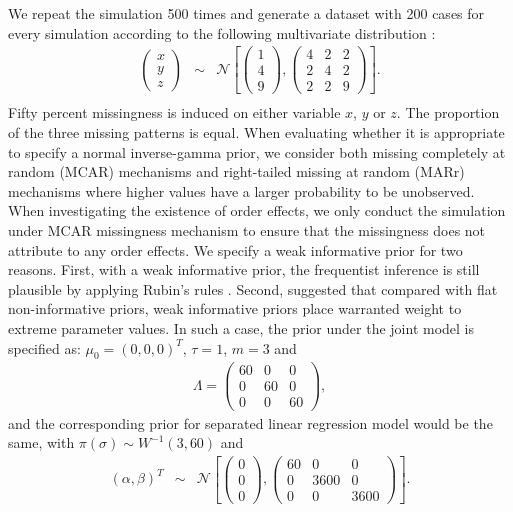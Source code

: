	We repeat the simulation 500 times and generate a dataset with 200 cases for every simulation according to the following multivariate distribution :
	\begin{eqnarray*}
		\begin{pmatrix}x\\
			y\\
			z
		\end{pmatrix} & \sim & \mathcal{N}\left[\left(\begin{array}{c}
			1\\
			4\\
			9
		\end{array}\right),\left(\begin{array}{ccc}
			4 & 2 & 2\\
			2 & 4 & 2\\
			2 & 2 & 9 
		\end{array}\right)\right].\\
	\end{eqnarray*}
	Fifty percent missingness is induced on either variable $x$, $y$ or $z$. The proportion of the three missing patterns is equal. When evaluating whether it is appropriate to specify a normal inverse-gamma prior, we consider both missing completely at random (MCAR) mechanisms and right-tailed missing at random (MARr) mechanisms where higher values have a larger probability to be unobserved. When investigating the existence of order effects, we only conduct the simulation under MCAR missingness mechanism to ensure that the missingness does not attribute to any order effects. We specify a weak informative prior for two reasons. First, with a weak informative prior, the frequentist inference is still plausible by applying Rubin's rules \citep[p. 76]{RubinD1987}. Second, \citet{Goodrich2019} suggested that compared with flat non-informative priors, weak informative priors place warranted weight to extreme parameter values. In such a case, the prior under the joint model is specified as: $\mu_{0} = (0, 0, 0)^T$, $\tau = 1$, $m = 3$ and 
	\begin{eqnarray*}
		\Lambda = \left(\begin{array}{ccc}
			60 & 0 & 0\\
			0 & 60 & 0\\
			0 & 0 & 60 
		\end{array}\right),
	\end{eqnarray*}
	and the corresponding prior for separated linear regression model would be the same, with $\pi(\sigma) \sim W^{-1}(3, 60)$ and 
	\begin{eqnarray*}
		(\alpha, \beta)^T
		& \sim & \mathcal{N}\left[\left(\begin{array}{c}
			0\\
			0\\
			0
		\end{array}\right),\left(\begin{array}{ccc}
			60 & 0 & 0\\
			0 & 3600 & 0\\
			0 & 0 & 3600 
		\end{array}\right)\right].\\
	\end{eqnarray*}
